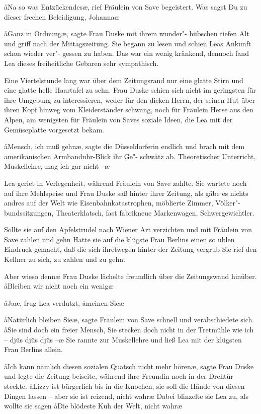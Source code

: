 \aa{}Na so was Entzückendes\ae{}, rief Fräulein von Save begeistert.
\aanah{}Was sagst Du zu dieser frechen Beleidigung, Johanna\frag{}\ae{}

\aa{}Ganz in Ordnung\ae{}, sagte Frau Duske mit ihrem wunder"-%
hübschen tiefen Alt und griff nach der Mittagszeitung. Sie
begann zu lesen und schien Leas Ankunft schon wieder ver"-%
gessen zu haben. Das war ein wenig kränkend, dennoch fand
Lea dieses freiheitliche Gebaren sehr sympathisch.

Eine Viertelstunde lang war über dem Zeitungsrand nur eine
glatte Stirn und eine glatte helle Haartafel zu sehn. Frau
Duske schien sich nicht im geringsten für ihre Umgebung zu
interessieren, weder für den dicken Herrn, der seinen Hut
über ihren Kopf hinweg vom Kleiderständer schwang, noch
für Fräulein Herse aus den Alpen, am wenigsten für Fräulein
von Saves soziale Ideen, die Lea mit der Gemüseplatte
vorgesetzt bekam.

\aa{}Mensch, ich muß gehn\ae{}, sagte die Düsseldorferin endlich und
brach mit dem amerikanischen Armbanduhr-Blick ihr Ge"-%
schwätz ab. \aanah{}Theoretischer Unterricht, Muskellehre, mag ich
gar nicht --\ae{}

Lea geriet in Verlegenheit, während Fräulein von Save
zahlte. Sie wartete noch auf ihre Mehlspeise und Frau Duske
saß hinter ihrer Zeitung, als gäbe es nichts andres auf der
Welt wie Eisenbahnkatastrophen, möblierte Zimmer, Völker"-%
bundssitzungen, Theaterklatsch, fast fabrikneue Markenwagen,
Schwergewichtler.

Sollte sie auf den Apfelstrudel nach Wiener Art verzichten
und mit Fräulein von Save zahlen und gehn\frag{} Hatte sie auf
die klügste Frau Berlins einen so üblen Eindruck gemacht,
daß die sich ihretwegen hinter der Zeitung vergrub\frag{} Sie rief
den Kellner zu sich, zu zahlen und zu gehn.

\aanah{}Aber wieso denn\frag{}\ae{} Frau Duske lächelte freundlich über die
Zeitungswand hinüber. \aa{}Bleiben wir nicht noch ein wenig\frag{}\ae{}

\aa{}Ja\frag{}\ae{}, frug Lea verdutzt, \aa{}meinen Sie\frag{}\ae{}

\aa{}Natürlich bleiben Sie\ae{}, sagte Fräulein von Save schnell
und verabschiedete sich. \aa{}Sie sind doch ein freier Mensch, Sie
stecken doch nicht in der Tretmühle wie ich -- djüs djüs djüs --\ae{}
Sie rannte zur Muskellehre und ließ Lea mit der klügsten
Frau Berlins allein.

\aa{}Ich kann nämlich diesen sozialen Quatsch nicht mehr hören\ae{},
sagte Frau Duske und legte die Zeitung beiseite, während
ihre Freundin noch in der Drehtür steckte. \aa{}Lizzy ist bürgerlich
bis in die Knochen, sie soll die Hände von diesen Dingen lassen
-- aber sie ist reizend, nicht wahr\frag{}\ae{} Dabei blinzelte sie Lea
zu, als wollte sie sagen\dopp{} \aa{}Die blödeste Kuh der Welt, nicht
wahr\frag{}\ae{}

